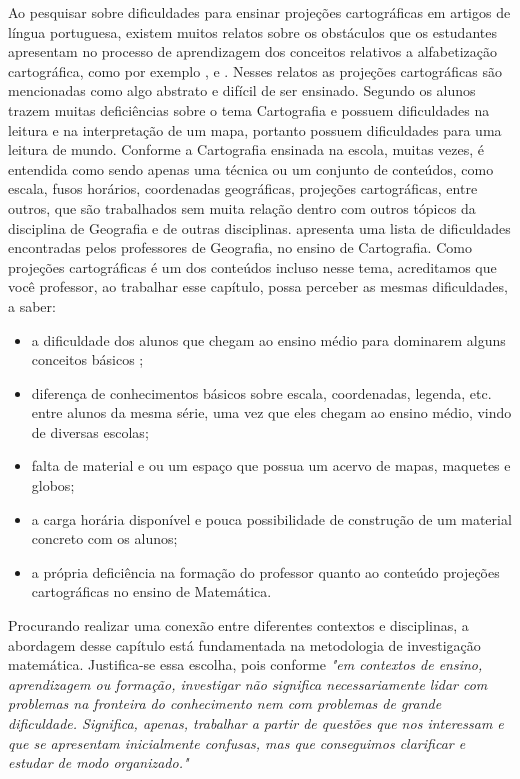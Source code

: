 \begin{apresentacao}
{Ao pesquisar sobre dificuldades para ensinar projeções cartográficas em artigos de língua portuguesa, existem muitos relatos sobre os obstáculos que os estudantes apresentam no processo de aprendizagem dos conceitos relativos a alfabetização cartográfica, como por exemplo \cite{Almeida}, \cite{Lunkes} e \cite{Ludwig}. Nesses relatos as projeções cartográficas são mencionadas como algo abstrato e difícil de ser ensinado. Segundo \cite{Lunkes} os alunos trazem muitas deficiências sobre o tema Cartografia e possuem dificuldades na leitura e na interpretação de um mapa, portanto possuem dificuldades para uma leitura de mundo. Conforme \cite{Ludwig} a Cartografia ensinada na escola,  muitas vezes, é entendida como sendo apenas uma técnica ou um conjunto de conteúdos, como escala, fusos horários, coordenadas geográficas, projeções cartográficas, entre outros, que são trabalhados sem muita relação dentro com outros tópicos da disciplina de Geografia e de outras disciplinas. \cite{Lunkes} apresenta uma lista de dificuldades encontradas pelos professores de Geografia, no ensino de Cartografia. Como projeções cartográficas é um dos conteúdos incluso nesse tema, acreditamos que você professor, ao trabalhar esse capítulo, possa perceber as mesmas dificuldades, a saber:

\begin{itemize}
\item a dificuldade dos alunos que chegam ao ensino médio para dominarem alguns conceitos básicos ;
\item  diferença de conhecimentos básicos sobre escala, coordenadas, legenda, etc. entre alunos da mesma série, uma vez que eles chegam ao ensino médio, vindo de diversas escolas;
\item  falta de material e ou um espaço que possua um acervo de mapas, maquetes e globos;

\item a carga horária disponível e pouca possibilidade de construção de um material concreto com os alunos; 

\item a própria deficiência na formação do professor quanto ao conteúdo projeções cartográficas no ensino de Matemática.
\end{itemize}



Procurando realizar uma conexão entre diferentes contextos e disciplinas, a abordagem desse capítulo está fundamentada na metodologia de investigação matemática. Justifica-se essa escolha, pois conforme \cite[p.2]{Ponte} \textit{"em contextos de ensino, aprendizagem ou formação, investigar não significa necessariamente lidar com problemas na fronteira do conhecimento nem com problemas de grande dificuldade. Significa, apenas, trabalhar a partir de questões que nos interessam e que se apresentam inicialmente confusas, mas que conseguimos clarificar e estudar de modo organizado."{}}

}
\end{apresentacao}
